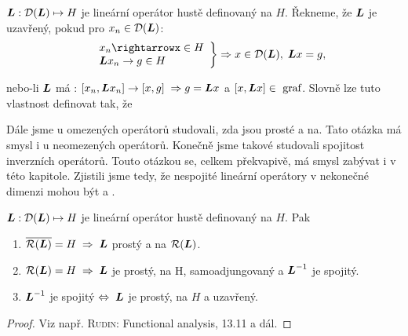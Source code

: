 \begin{definition}
$\boldsymbol{L} : \mathcal{D}(\boldsymbol{L}) \mapsto H$ je lineární operátor hustě definovaný na $H$.  Řekneme, že $\boldsymbol{L}$ je uzavřený, pokud pro $x_n\in\mathcal{D}(\boldsymbol{L})$:
 \begin{equation*}
    \begin{split}
        \left.
    \begin{array}{ll}
        &x_n\rightarrowx\in H\\
        &\map Lx_n\rightarrow g \in H
    \end{array}
        \right \} \Rightarrow x\in \mathcal{D}(\map L),\; \map Lx=g,
    \end{split}
\end{equation*}
\end{definition}
nebo-li $\boldsymbol{L}$ má : $[x_n,\boldsymbol{L}x_n]\rightarrow [x,g]\;\Rightarrow g=\boldsymbol{L} x$ a $[x,\boldsymbol{L}x]\in \text{ graf}$. Slovně lze tuto vlastnost definovat tak, že 

Dále jsme u omezených operátorů studovali, zda jsou prosté a na. Tato otázka má smysl i u neomezených operátorů. Konečně jsme takové studovali spojitost inverzních operátorů. Touto otázkou se, celkem překvapivě, má smysl zabývat i v této kapitole. Zjistili jsme tedy, že nespojité lineární operátory v nekonečné dimenzi mohou být  a .

\begin{theorem}
$\boldsymbol{L} : \mathcal{D}(\boldsymbol{L}) \mapsto H$ je lineární operátor hustě definovaný na $H$. Pak 
\begin{enumerate}
    \item $\overline{\mathcal{R}(\boldsymbol{L})} = H\;\Rightarrow\; \boldsymbol{L}$ prostý a na $\mathcal{R} (\boldsymbol{L})$.
    \item $\mathcal{R}(\boldsymbol{L}) = H\;\Rightarrow\; \boldsymbol{L}$ je prostý, na H, samoadjungovaný a $\boldsymbol{L}^{-1}$ je spojitý.
    \item $\boldsymbol{L}^{-1}$ je spojitý $\Leftrightarrow\;\boldsymbol{L}$ je prostý, na $H$ a uzavřený.
\end{enumerate} 
\end{theorem}
\begin{proof}
Viz např.  \textsc{Rudin}: Functional analysis, 13.11 a dál.
\end{proof}

